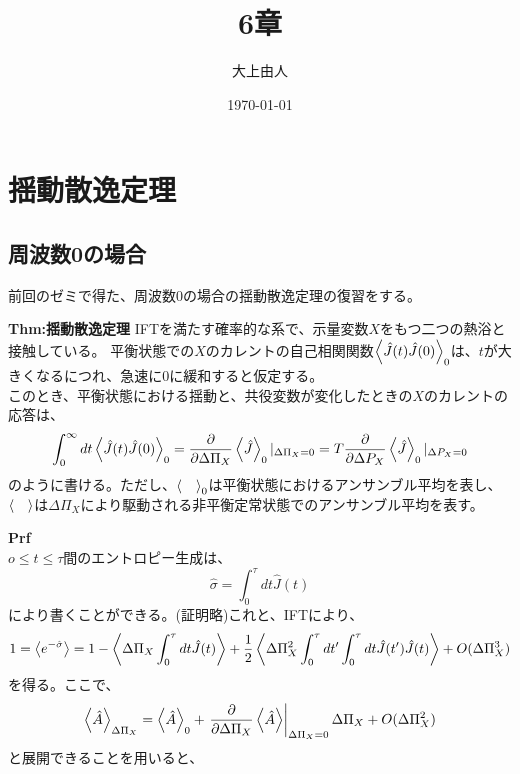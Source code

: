 \documentclass[a4paper,11pt]{jsarticle}
\begin{document}
\title{6章}
\author{大上由人}
\date{\today}
\maketitle
\section{揺動散逸定理}
\subsection{周波数0の場合}
前回のゼミで得た、周波数0の場合の揺動散逸定理の復習をする。\\
\begin{itembox}[l]{\textbf{Thm:揺動散逸定理}}
    IFTを満たす確率的な系で、示量変数$X$をもつ二つの熱浴と接触している。
        平衡状態での$X$のカレントの自己相関関数$\ev{\hat{J}(t)\hat{J}(0)}_0$は、$t$が大きくなるにつれ、急速に0に緩和すると仮定する。\\
        このとき、平衡状態における揺動と、共役変数が変化したときの$X$のカレントの応答は、
    \begin{equation}
        \int_{0}^{\infty} dt \ev{\hat{J}(t)\hat{J}(0)}_0 = \pdv{\Delta \Pi_X} \ev{\hat{J}}_0|_{\Delta \Pi_X = 0} =T\pdv{\Delta P_X} \ev{\hat{J}}_0|_{\Delta P_X = 0}
    \end{equation}
    のように書ける。ただし、$\ev{\quad}_0$は平衡状態におけるアンサンブル平均を表し、$\ev{\quad}$は$\Delta \Pi_X$により駆動される非平衡定常状態でのアンサンブル平均を表す。
\end{itembox}
\textbf{Prf}\\
$o \leq t \leq \tau$間のエントロピー生成は、
\begin{equation}
    \hat{\sigma} = \int_{0}^{\tau} dt \hat{J}(t) 
\end{equation}
により書くことができる。(証明略)これと、IFTにより、
\begin{align}
    1=\ev{e^{-\hat{\sigma}}}&=1-\ev{\Delta \Pi_X \int_{0}^{\tau} dt \hat{J}(t)} + \frac{1}{2}\ev{\Delta \Pi_X ^2 \int_{0}^{\tau} dt' \int_{0}^{\tau} dt \hat{J}(t')\hat{J}(t)} + O(\Delta \Pi_X ^3)\\
\end{align}
を得る。ここで、
\begin{equation}
    \ev{\hat{A}}_{\Delta \Pi_X} = \ev{\hat{A}}_0 + \left.\pdv{\Delta \Pi_X} \ev{\hat{A}}\right|_{\Delta \Pi_X = 0} \Delta \Pi_X + O(\Delta \Pi_X ^2)
\end{equation}
と展開できることを用いると、\\
\end{document}
